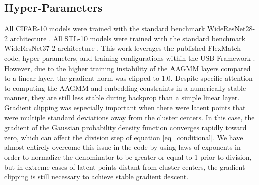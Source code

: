 \documentclass[10pt,twocolumn,letterpaper]{article}
\begin{document}
\subsection{Hyper-Parameters}
\label{hyperparams}

All CIFAR-10 models were trained with the standard benchmark WideResNet28-2 architecture \cite{zagoruyko2016wide}.
All STL-10 models were trained with the standard benchmark WideResNet37-2 architecture \cite{zagoruyko2016wide}.
This work leverages the published FlexMatch \cite{zhang2021flexmatch} code, hyper-parameters, and training configurations within the USB Framework \cite{wang2022usb}.
However, due to the higher training instability of the AAGMM layers compared to a linear layer, the gradient norm was clipped to 1.0.
Despite specific attention to computing the AAGMM and embedding constraints in a numerically stable manner, they are still less stable during backprop than a simple linear layer.  
Gradient clipping was especially important when there were latent points that were multiple standard deviations away from the cluster centers.  
In this case, the gradient of the Gaussian probability density function converges rapidly toward zero, which can affect the division step of equation \ref{eq_conditional}.  
We have almost entirely overcome this issue in the code by using laws of exponents in order to normalize the denominator to be greater or equal to 1 prior to division, but in extreme cases of latent points distant from cluster centers, the gradient clipping is still necessary to achieve stable gradient descent.
\end{document}
